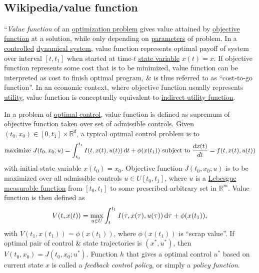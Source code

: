 \documentclass{article}
\begin{document}
\subsection{Wikipedia{\tt/}value function}
``{\it Value function} of an \href{https://en.wikipedia.org/wiki/Optimization_problem}{optimization problem} gives value attained by \href{https://en.wikipedia.org/wiki/Objective_function}{objective function} at a solution, while only depending on \href{https://en.wikipedia.org/wiki/Parameter}{parameters} of problem. In a \href{https://en.wikipedia.org/wiki/Control_theory}{controlled} \href{https://en.wikipedia.org/wiki/Dynamical_system}{dynamical system}, value function represents optimal payoff of system over interval $[t,t_1]$ when started at time-$t$ \href{https://en.wikipedia.org/wiki/State_variable}{state variable} $x(t) = x$. If objective function represents some cost that is to be minimized, value function can be interpreted as cost to finish optimal program, \& is thus referred to as ``cost-to-go function''. In an economic context, where objective function usually represents \href{https://en.wikipedia.org/wiki/Utility}{utility}, value function is conceptually equivalent to \href{https://en.wikipedia.org/wiki/Indirect_utility_function}{indirect utility function}.

In a problem of \href{https://en.wikipedia.org/wiki/Optimal_control}{optimal control}, value function is defined as supremum of objective function taken over set of admissible controls. Given $(t_0,x_0)\in[0,t_1]\times\mathbb{R}^d$, a typical optimal control problem is to
\begin{equation*}
	\mbox{maximize } J(t_0,x_0;u) = \int_{t_0}^{t_1} I(t,x(t),u(t))\,{\rm d}t + \phi(x(t_1))\mbox{ subject to }\frac{dx(t)}{dt} = f(t,x(t),u(t))
\end{equation*}
with initial state variable $x(t_0) = x_0$. Objective function $J(t_0,x_0;u)$ is to be maximized over all admissible controls $u\in U[t_0,t_1]$, where $u$ is a \href{https://en.wikipedia.org/wiki/Measurable_function}{Lebesgue measurable function} from $[t_0,t_1]$ to some prescribed arbitrary set in $\mathbb{R}^m$. Value function is then defined as
\begin{equation*}
	V(t,x(t)) = \max_{u\in U} \int_t^{t_1} I(\tau,x(\tau),u(\tau))\,{\rm d}\tau + \phi(x(t_1)),
\end{equation*}
with $V(t_1,x(t_1)) = \phi(x(t_1))$, where $\phi(x(t_1))$ is ``scrap value''. If optimal pair of control \& state trajectories is $(x^*,u^*)$, then $V(t_0,x_0) = J(t_0,x_0;u^*)$. Function $h$ that gives a optimal control $u^*$ based on current state $x$ is called a {\it feedback control policy}, or simply a {\it policy function}.
\end{document}
